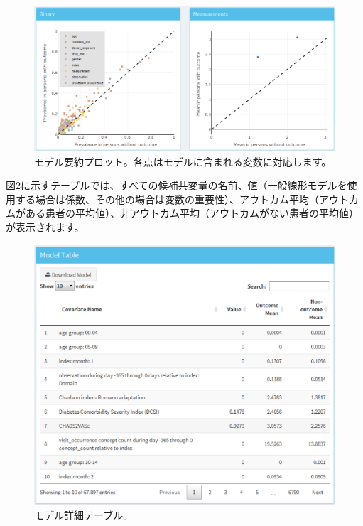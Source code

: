 \documentclass[
  11pt]{book}
\theoremstyle{definition}
\theoremstyle{definition}
\theoremstyle{definition}
\theoremstyle{definition}
\theoremstyle{remark}
\begin{document}
\begin{figure}

{\centering \includegraphics[width=1\linewidth]{images/PatientLevelPrediction/shiny/shinyModelPlots} 

}

\caption{モデル要約プロット。各点はモデルに含まれる変数に対応します。}\label{fig:shinyModelPlots}
\end{figure}

図\ref{fig:shinyModelTable}に示すテーブルでは、すべての候補共変量の名前、値（一般線形モデルを使用する場合は係数、その他の場合は変数の重要性）、アウトカム平均（アウトカムがある患者の平均値）、非アウトカム平均（アウトカムがない患者の平均値）が表示されます。

\begin{figure}

{\centering \includegraphics[width=1\linewidth]{images/PatientLevelPrediction/shiny/shinyModelTable} 

}

\caption{モデル詳細テーブル。}\label{fig:shinyModelTable}
\end{figure}
\end{document}
